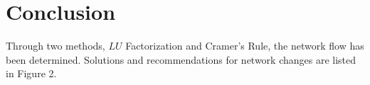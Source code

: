 \documentclass[paper.tex]{subfiles}
\begin{document}
\section{Conclusion}

Through two methods, $LU$ Factorization and Cramer's Rule, the network flow has been determined.
Solutions and recommendations for network changes are listed in Figure 2.
\vspace{1in}
\end{document}

